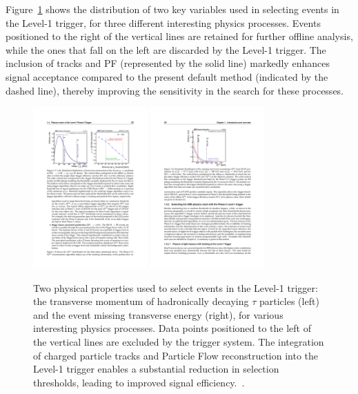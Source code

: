 \documentclass[12pt]{iopart}
\begin{document}
Figure~\ref{fig:phase2_physics} shows the distribution of two key variables used in selecting events in the Level-1 trigger, for three different interesting physics processes. Events positioned to the right of the vertical lines are retained for further offline analysis, while the ones that fall on the left are discarded by the Level-1 trigger. The inclusion of tracks and PF (represented by the solid line) markedly enhances signal acceptance compared to the present default method (indicated by the dashed line), thereby improving the sensitivity in the search for these processes.
\begin{figure}[h]
  \centering
  \includegraphics[width=0.39\textwidth]{figures/phase2_tauh.pdf}
  \includegraphics[width=0.39\textwidth]{figures/phase2_etmiss.pdf}
  \caption{Two physical properties used to select events in the Level-1 trigger: the transverse momentum of hadronically decaying $\tau$ particles (left) and the event missing transverse energy (right), for various interesting physics processes. Data points positioned to the left of the vertical lines are excluded by the trigger system. The integration of charged particle tracks and Particle Flow reconstruction into the Level-1 trigger enables a substantial reduction in selection thresholds, leading to improved signal efficiency.~\cite{tdr}.} %
  \label{fig:phase2_physics} %
\end{figure}
\end{document}
